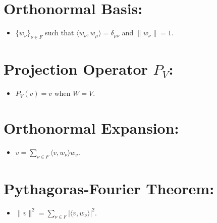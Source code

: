 \documentclass{article}
\begin{document}
\section{Orthonormal Basis:}
\begin{itemize}
    \item $\{ w_\nu \}_{\nu \in F}$ such that $\langle w_\nu, w_\mu \rangle = \delta_{\mu \nu}$ and $\| w_\nu \| = 1$.
\end{itemize}

\section{Projection Operator $P_V$:}
\begin{itemize}
    \item $P_V(v) = v$ when $W = V$.
\end{itemize}

\section{Orthonormal Expansion:}
\begin{itemize}
    \item $v = \sum_{\nu \in F} \langle v, w_\nu \rangle w_\nu$.
\end{itemize}

\section{Pythagoras-Fourier Theorem:}
\begin{itemize}
    \item $\| v \|^2 = \sum_{\nu \in F} |\langle v, w_\nu \rangle|^2$.
\end{itemize}
\end{document}
